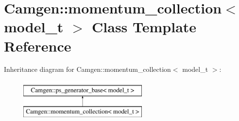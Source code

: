 \hypertarget{a00376}{}\section{Camgen\+:\+:momentum\+\_\+collection$<$ model\+\_\+t $>$ Class Template Reference}
\label{a00376}
Inheritance diagram for Camgen\+:\+:momentum\+\_\+collection$<$ model\+\_\+t $>$\+:\begin{figure}[H]
\begin{center}
\leavevmode
\includegraphics[height=2.000000cm]{a00376}
\end{center}
\end{figure}
